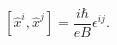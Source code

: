\begin{equation}
\left[  \hat{x}^{i},\hat{x}^{j}\right]  =\frac{i\hbar}{eB}\epsilon
^{ij}.\label{4}%
\end{equation}

